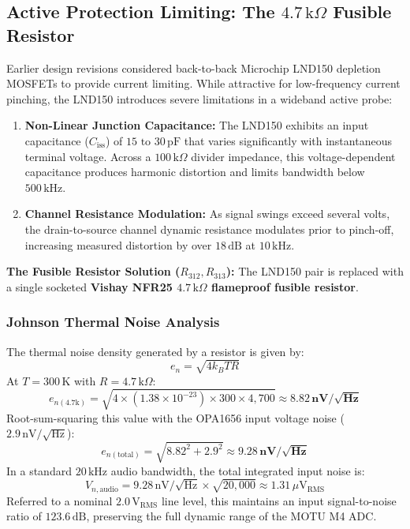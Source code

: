 \documentclass[11pt, letterpaper]{article}
\begin{document}
\subsection{Active Protection Limiting: The \texorpdfstring{$4.7\,\text{k}\Omega$}{4.7 k-ohm} Fusible Resistor}
Earlier design revisions considered back-to-back Microchip LND150 depletion MOSFETs to provide current limiting. While attractive for low-frequency current pinching, the LND150 introduces severe limitations in a wideband active probe:
\begin{enumerate}[label=\textbf{\alph*.}]
    \item \textbf{Non-Linear Junction Capacitance:} The LND150 exhibits an input capacitance ($C_{\text{iss}}$) of $15\text{ to }30\,\text{pF}$ that varies significantly with instantaneous terminal voltage. Across a $100\,\text{k}\Omega$ divider impedance, this voltage-dependent capacitance produces harmonic distortion and limits bandwidth below $500\,\text{kHz}$.
    \item \textbf{Channel Resistance Modulation:} As signal swings exceed several volts, the drain-to-source channel dynamic resistance modulates prior to pinch-off, increasing measured distortion by over $18\,\text{dB}$ at $10\,\text{kHz}$.
\end{enumerate}

\textbf{The Fusible Resistor Solution ($R_{312}, R_{313}$):} The LND150 pair is replaced with a single socketed \textbf{Vishay NFR25 $4.7\,\text{k}\Omega$ flameproof fusible resistor}.

\subsubsection{Johnson Thermal Noise Analysis}
The thermal noise density generated by a resistor is given by:
\begin{equation}
    e_n = \sqrt{4 k_B T R}
\end{equation}
At $T = 300\,\text{K}$ with $R = 4.7\,\text{k}\Omega$:
\begin{equation}
    e_{n(4.7\text{k})} = \sqrt{4 \times (1.38 \times 10^{-23}) \times 300 \times 4{,}700} \approx \mathbf{8.82\,\text{nV}/\sqrt{\text{Hz}}}
\end{equation}
Root-sum-squaring this value with the OPA1656 input voltage noise ($2.9\,\text{nV}/\sqrt{\text{Hz}}$):
\begin{equation}
    e_{n(\text{total})} = \sqrt{8.82^2 + 2.9^2} \approx \mathbf{9.28\,\text{nV}/\sqrt{\text{Hz}}}
\end{equation}
In a standard $20\,\text{kHz}$ audio bandwidth, the total integrated input noise is:
\begin{equation}
    V_{n,\text{audio}} = 9.28\,\text{nV}/\sqrt{\text{Hz}} \times \sqrt{20{,}000} \approx 1.31\,\mu\text{V}_{\text{RMS}}
\end{equation}
Referred to a nominal $2.0\,\text{V}_{\text{RMS}}$ line level, this maintains an input signal-to-noise ratio of \textbf{$123.6\,\text{dB}$}, preserving the full dynamic range of the MOTU M4 ADC.
\end{document}
